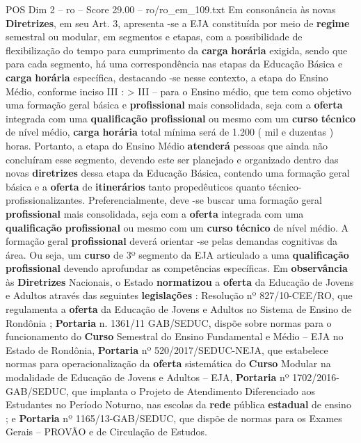 \begin{textsample}{POS Dim 2 – ro – Score 29.00 – ro/ro\_em\_109.txt}
Em consonância às novas \textbf{Diretrizes}, em seu Art. 3, apresenta -se a EJA constituída por meio de \textbf{regime} semestral ou modular, em segmentos e etapas, com a possibilidade de flexibilização do tempo para cumprimento da \textbf{carga} \textbf{horária} exigida, sendo que para cada segmento, há uma correspondência nas etapas da Educação Básica e \textbf{carga} \textbf{horária} específica, destacando -se nesse contexto, a etapa do Ensino Médio, conforme inciso III : > III – para o Ensino médio, que tem como objetivo uma formação geral básica e \textbf{profissional} mais consolidada, seja com a \textbf{oferta} integrada com uma \textbf{qualificação} \textbf{profissional} ou mesmo com um \textbf{curso} \textbf{técnico} de nível médio, \textbf{carga} \textbf{horária} total mínima será de 1.200 ( mil e duzentas ) horas.
Portanto, a etapa do Ensino Médio \textbf{atenderá} pessoas que ainda não concluíram esse segmento, devendo este ser planejado e organizado dentro das novas \textbf{diretrizes} dessa etapa da Educação Básica, contendo uma formação geral básica e a \textbf{oferta} de \textbf{itinerários} tanto propedêuticos quanto técnico-profissionalizantes.
Preferencialmente, deve -se buscar uma formação geral \textbf{profissional} mais consolidada, seja com a \textbf{oferta} integrada com uma \textbf{qualificação} \textbf{profissional} ou mesmo com um \textbf{curso} \textbf{técnico} de nível médio.
A formação geral \textbf{profissional} deverá orientar -se pelas demandas cognitivas da área.
Ou seja, um \textbf{curso} de 3º segmento da EJA articulado a uma \textbf{qualificação} \textbf{profissional} devendo aprofundar as competências específicas.
Em \textbf{observância} às \textbf{Diretrizes} Nacionais, o Estado \textbf{normatizou} a \textbf{oferta} da Educação de Jovens e Adultos através das seguintes \textbf{legislações} : Resolução nº 827/10-CEE/RO, que regulamenta a \textbf{oferta} da Educação de Jovens e Adultos no Sistema de Ensino de Rondônia ; \textbf{Portaria} n. 1361/11 GAB/SEDUC, dispõe sobre normas para o funcionamento do \textbf{Curso} Semestral do Ensino Fundamental e Médio – EJA no Estado de Rondônia, \textbf{Portaria} nº 520/2017/SEDUC-NEJA, que estabelece normas para operacionalização da \textbf{oferta} sistemática do \textbf{Curso} Modular na modalidade de Educação de Jovens e Adultos – EJA, \textbf{Portaria} nº 1702/2016-GAB/SEDUC, que implanta o Projeto de Atendimento Diferenciado aos Estudantes no Período Noturno, nas escolas da \textbf{rede} pública \textbf{estadual} de ensino ; e \textbf{Portaria} nº 1165/13-GAB/SEDUC, que dispõe de normas para os Exames Gerais – PROVÃO e de Circulação de Estudos.

\end{textsample}
